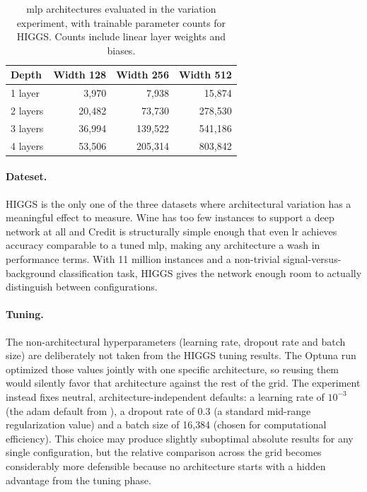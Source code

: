 \begin{table}[htbp]
\centering
\caption[\gls{mlp} architecture variation: configurations and parameter counts.]{\gls{mlp} architectures evaluated in the variation experiment, with trainable parameter counts for HIGGS. Counts include linear layer weights and biases.}
\label{tab:mlp_architectures}
\begin{tabular}{lrrr}
\toprule
\textbf{Depth} & \textbf{Width 128} & \textbf{Width 256} & \textbf{Width 512} \\
\midrule
1 layer  &   3{,}970 &   7{,}938 &  15{,}874 \\
2 layers &  20{,}482 &  73{,}730 & 278{,}530 \\
3 layers &  36{,}994 & 139{,}522 & 541{,}186 \\
4 layers &  53{,}506 & 205{,}314 & 803{,}842 \\
\bottomrule
\end{tabular}
\end{table}

\paragraph{Dateset.}
HIGGS is the only one of the three datasets where architectural variation has a meaningful effect to measure. Wine has too few instances to support a deep network at all and Credit is structurally simple enough that even \gls{lr} achieves accuracy comparable to a tuned \gls{mlp}, making any architecture a wash in performance terms. With 11 million instances and a non-trivial signal-versus-background classification task, HIGGS gives the network enough room to actually distinguish between configurations.

\paragraph{Tuning.}
The non-architectural hyperparameters (learning rate, dropout rate and batch size) are deliberately not taken from the HIGGS tuning results. The Optuna run optimized those values jointly with one specific architecture, so reusing them would silently favor that architecture against the rest of the grid. The experiment instead fixes neutral, architecture-independent defaults: a learning rate of $10^{-3}$ (the \gls{adam} default from \citeauthor{kingmaAdamMethodStochastic2015} \cite{kingmaAdamMethodStochastic2015}), a dropout rate of $0.3$ (a standard mid-range regularization value) and a batch size of 16{,}384 (chosen for computational efficiency). This choice may produce slightly suboptimal absolute results for any single configuration, but the relative comparison across the grid becomes considerably more defensible because no architecture starts with a hidden advantage from the tuning phase.

